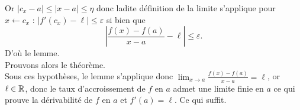 \documentclass{article}
\begin{document}
\begin{question_kholle}
    Or $|c_x-a| \leq |x-a| \leq \eta $ donc ladite définition de la limite s'applique pour $x\gets c_x$ : $|f'(c_x) - \ell|\leq \varepsilon $ si bien que $$|\frac{f(x)-f(a)}{x-a}- \ell |\leq \varepsilon.$$ D'où le lemme. \\
    \newline 
    Prouvons alors le théorème.\\
    Sous ces hypothèses, le lemme s'applique donc $\lim_{x\to a} \frac{f(x) -f(a)}{x-a} = \ell$, or $\ell \in \mathbb R$, donc le taux d'accroissement de $f$ en $a$ admet une limite finie en $a$ ce qui prouve la dérivabilité de $f$ en $a$ et $f'(a) = \ell$. Ce qui suffit.
\end{question_kholle}
\end{document}
